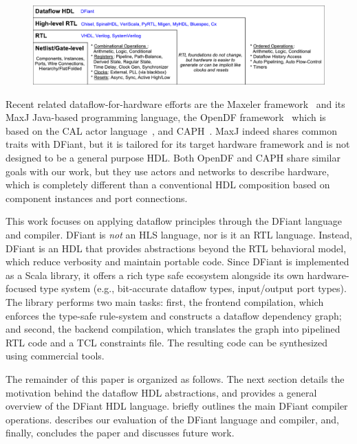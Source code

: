 \begin{figure}[t]
	\centering
	\captionsetup{justification=centering}
	\includegraphics[width=\linewidth]{graphics/motivation.pdf} 
	\label{fig:motivation}
\end{figure}

Recent related dataflow-for-hardware efforts are the Maxeler framework~\cite{Pell2011} and its MaxJ Java-based programming language, the OpenDF framework~\cite{bhattacharyya2008opendf} which is based on the CAL actor language~\cite{eker2003cal}, and CAPH~\cite{serot2011implementing}. MaxJ indeed shares common traits with DFiant, but it is tailored for its target hardware framework and is not designed to be a general purpose HDL. Both OpenDF and CAPH share similar goals with our work, but they use actors and networks to describe hardware, which is completely different than a conventional HDL composition based on component instances and port connections.

This work focuses on applying dataflow principles through the DFiant language and compiler. DFiant is \emph{not} an HLS language, nor is it an RTL language. Instead, DFiant is an HDL that provides abstractions beyond the RTL behavioral model, which reduce verbosity and maintain portable code. Since DFiant is implemented as a Scala library, it offers a rich type safe ecosystem alongside its own hardware-focused type system (e.g., bit-accurate dataflow types, input/output port types). The library performs two main tasks: first, the frontend compilation, which enforces the type-safe rule-system and constructs a dataflow dependency graph; and second, the backend compilation, which translates the graph into pipelined RTL code and a TCL constraints file. The resulting code can be synthesized using commercial tools. 

The remainder of this paper is organized as follows. The next section details the motivation behind the dataflow HDL abstractions, and  provides a general overview of the DFiant HDL language. 
 briefly outlines the main DFiant compiler operations.
 describes our evaluation of the DFiant language and compiler, and, finally,  concludes the paper and discusses future work.

 